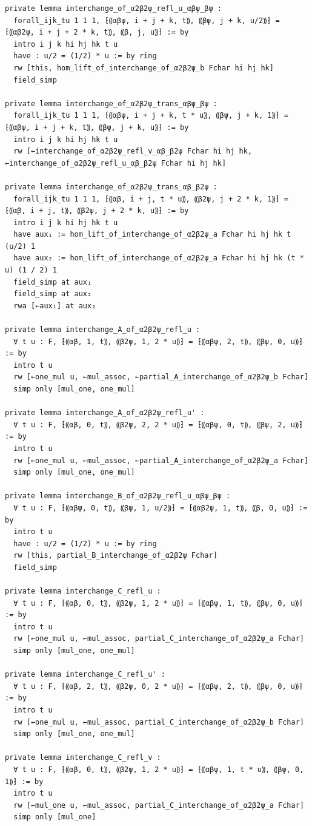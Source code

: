 \documentclass[10pt,a4paper]{article}
\begin{document}
\begin{Verbatim}
private lemma interchange_of_α2β2ψ_refl_u_αβψ_βψ :
  forall_ijk_tu 1 1 1, ⁅⸨αβψ, i + j + k, t⸩, ⸨βψ, j + k, u/2⸩⁆ = ⁅⸨αβ2ψ, i + j + 2 * k, t⸩, ⸨β, j, u⸩⁆ := by
  intro i j k hi hj hk t u
  have : u/2 = (1/2) * u := by ring
  rw [this, hom_lift_of_interchange_of_α2β2ψ_b Fchar hi hj hk]
  field_simp

private lemma interchange_of_α2β2ψ_trans_αβψ_βψ :
  forall_ijk_tu 1 1 1, ⁅⸨αβψ, i + j + k, t * u⸩, ⸨βψ, j + k, 1⸩⁆ = ⁅⸨αβψ, i + j + k, t⸩, ⸨βψ, j + k, u⸩⁆ := by
  intro i j k hi hj hk t u
  rw [←interchange_of_α2β2ψ_refl_v_αβ_β2ψ Fchar hi hj hk, ←interchange_of_α2β2ψ_refl_u_αβ_β2ψ Fchar hi hj hk]

private lemma interchange_of_α2β2ψ_trans_αβ_β2ψ :
  forall_ijk_tu 1 1 1, ⁅⸨αβ, i + j, t * u⸩, ⸨β2ψ, j + 2 * k, 1⸩⁆ = ⁅⸨αβ, i + j, t⸩, ⸨β2ψ, j + 2 * k, u⸩⁆ := by
  intro i j k hi hj hk t u
  have aux₁ := hom_lift_of_interchange_of_α2β2ψ_a Fchar hi hj hk t (u/2) 1
  have aux₂ := hom_lift_of_interchange_of_α2β2ψ_a Fchar hi hj hk (t * u) (1 / 2) 1
  field_simp at aux₁
  field_simp at aux₂
  rwa [←aux₁] at aux₂

private lemma interchange_A_of_α2β2ψ_refl_u :
  ∀ t u : F, ⁅⸨αβ, 1, t⸩, ⸨β2ψ, 1, 2 * u⸩⁆ = ⁅⸨αβψ, 2, t⸩, ⸨βψ, 0, u⸩⁆ := by
  intro t u
  rw [←one_mul u, ←mul_assoc, ←partial_A_interchange_of_α2β2ψ_b Fchar]
  simp only [mul_one, one_mul]

private lemma interchange_A_of_α2β2ψ_refl_u' :
  ∀ t u : F, ⁅⸨αβ, 0, t⸩, ⸨β2ψ, 2, 2 * u⸩⁆ = ⁅⸨αβψ, 0, t⸩, ⸨βψ, 2, u⸩⁆ := by
  intro t u
  rw [←one_mul u, ←mul_assoc, ←partial_A_interchange_of_α2β2ψ_a Fchar]
  simp only [mul_one, one_mul]

private lemma interchange_B_of_α2β2ψ_refl_u_αβψ_βψ :
  ∀ t u : F, ⁅⸨αβψ, 0, t⸩, ⸨βψ, 1, u/2⸩⁆ = ⁅⸨αβ2ψ, 1, t⸩, ⸨β, 0, u⸩⁆ := by
  intro t u
  have : u/2 = (1/2) * u := by ring
  rw [this, partial_B_interchange_of_α2β2ψ Fchar]
  field_simp

private lemma interchange_C_refl_u :
  ∀ t u : F, ⁅⸨αβ, 0, t⸩, ⸨β2ψ, 1, 2 * u⸩⁆ = ⁅⸨αβψ, 1, t⸩, ⸨βψ, 0, u⸩⁆ := by
  intro t u
  rw [←one_mul u, ←mul_assoc, partial_C_interchange_of_α2β2ψ_a Fchar]
  simp only [mul_one, one_mul]

private lemma interchange_C_refl_u' :
  ∀ t u : F, ⁅⸨αβ, 2, t⸩, ⸨β2ψ, 0, 2 * u⸩⁆ = ⁅⸨αβψ, 2, t⸩, ⸨βψ, 0, u⸩⁆ := by
  intro t u
  rw [←one_mul u, ←mul_assoc, partial_C_interchange_of_α2β2ψ_b Fchar]
  simp only [mul_one, one_mul]

private lemma interchange_C_refl_v :
  ∀ t u : F, ⁅⸨αβ, 0, t⸩, ⸨β2ψ, 1, 2 * u⸩⁆ = ⁅⸨αβψ, 1, t * u⸩, ⸨βψ, 0, 1⸩⁆ := by
  intro t u
  rw [←mul_one u, ←mul_assoc, partial_C_interchange_of_α2β2ψ_a Fchar]
  simp only [mul_one]


\end{Verbatim}
\end{document}
